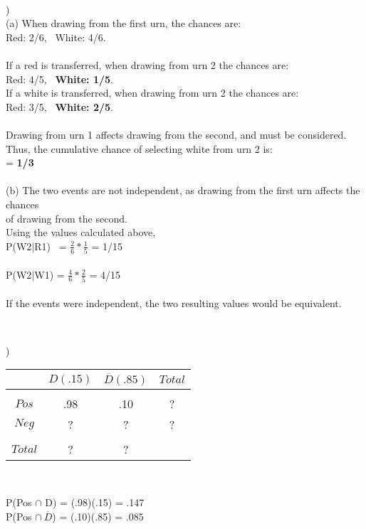 \documentclass[12pt]{article}
\begin{document}
\noindent \hrulefill \\
\pagebreak


)\\
\indent (a) When drawing from the first urn, the chances are:\\
\indent \indent Red: 2/6, \ White: 4/6.\\\\
\indent \indent If a red is transferred, when drawing from urn 2 the chances are: \\
\indent \indent Red: 4/5, \ \textbf{White: 1/5}.\\
\indent \indent If a white is transferred, when drawing from urn 2 the chances are: \\
\indent \indent Red: 3/5, \ \textbf{White: 2/5}.\\\\
\indent \indent Drawing from urn 1 affects drawing from the second, and must be considered.\\
\indent \indent Thus, the cumulative chance of selecting white from urn 2 is:\\ 
\indent {} = \textbf{1/3}\\\\

\indent (b) The two events are not independent, as drawing from the first urn affects the chances\\
\indent \indent  of drawing from the second.\\
\indent \indent Using the values calculated above, \\
\indent \indent P(W2$|$R1) \ = {\Large$ \frac{2}{6}*\frac{1}{5}$} = 1/15\\\\
\indent \indent P(W2$|$W1) = {\Large$ \frac{4}{6}*\frac{2}{5}$} = 4/15\\\\
\indent \indent If the events were independent, the two resulting values would be equivalent.


\noindent \hrulefill \\

\begin{multicols}{2}
)
\begin{tabular}{c|cc|c}
 & $D(.15)$ & $\overline{D}(.85)$ & $Total$ \\
 \hline &&&\\[-1em]
$Pos$ & .98 & .10 & ?\\
$Neg$ & ? & ? & ?\\
 \hline &&&\\[-1em]
 $Total$ & ? & ? & 
\end{tabular}\\

\columnbreak 

\hfill \break
\noindent P(Pos $\cap$ D) = (.98)(.15) = .147\\
P(Pos $\cap \ \overline{D}$) = (.10)(.85) = .085\\

\end{multicols}
\end{document}
